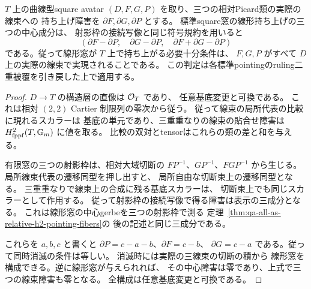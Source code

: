 \begin{corollary}[幾何avatarの線束と線形窓の持ち上げ障害]
\label{cor:qa-avatar-line-and-window-obstructions}
$T$ 上の曲線型square avatar
$(D,F,G,P)$ を取り、三つの相対Picard類の実際の線束への
持ち上げ障害を $\partial F,\partial G,\partial P$ とする。
標準square窓の線形持ち上げの三つの中心成分は、
射影枠の接続写像と同じ符号規約を用いると
\[
 (\partial F-\partial P,\quad
  \partial G-\partial P,\quad
  \partial F+\partial G-\partial P)
\]
である。従って線形窓が $T$ 上で持ち上がる必要十分条件は、
$F,G,P$ がすべて $D$ 上の実際の線束で実現されることである。
この判定は各標準pointingのruling二重被覆を引き戻した上で適用する。
\end{corollary}
\begin{proof}
$D\to T$ の構造層の直像は $\mathcal O_T$ であり、
任意基底変更と可換である。
これは相対 $(2,2)$ Cartier 制限列の零次から従う。
従って線束の局所代表の比較に現れるスカラーは
基底の単元であり、三重重なりの線束の貼合せ障害は
$H^2_{\mathrm{fppf}}(T,\mathbb G_m)$ に値を取る。
比較の双対とtensorはこれらの類の差と和を与える。

有限窓の三つの射影枠は、相対大域切断の
$FP^{-1}$、$GP^{-1}$、$FGP^{-1}$ から生じる。
局所線束代表の遷移同型を押し出すと、
局所自由な切断束上の遷移同型となる。
三重重なりで線束上の合成に残る基底スカラーは、
切断束上でも同じスカラーとして作用する。
従って射影枠の接続写像で得る障害は表示の三成分となる。
これは線形窓の中心gerbeを三つの射影枠で測る
定理~\ref{thm:qa-all-as-relative-h2-pointing-fibers}の
後の記述と同じ三成分である。

これらを $a,b,c$ と書くと
$\partial P=c-a-b$、$\partial F=c-b$、
$\partial G=c-a$ である。従って同時消滅の条件は等しい。
消滅時には実際の三線束の切断の積から
線形窓を構成できる。逆に線形窓が与えられれば、
その中心障害は零であり、上式で三つの線束障害も零となる。
全構成は任意基底変更と可換である。
\end{proof}

